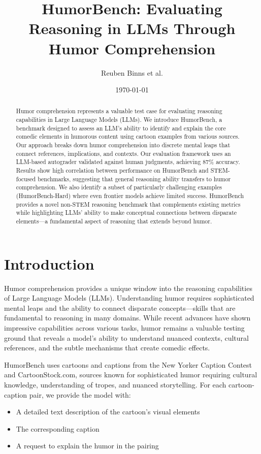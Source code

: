\documentclass[twocolumn]{article}
\title{HumorBench: Evaluating Reasoning in LLMs Through Humor Comprehension}
\author{Reuben Binns et al.}
\date{\today}
\begin{document}
\maketitle

\begin{abstract}
Humor comprehension represents a valuable test case for evaluating reasoning capabilities in Large Language Models (LLMs). We introduce HumorBench, a benchmark designed to assess an LLM's ability to identify and explain the core comedic elements in humorous content using cartoon examples from various sources. Our approach breaks down humor comprehension into discrete mental leaps that connect references, implications, and contexts. Our evaluation framework uses an LLM-based autograder validated against human judgments, achieving 87\% accuracy. Results show high correlation between performance on HumorBench and STEM-focused benchmarks, suggesting that general reasoning ability transfers to humor comprehension. We also identify a subset of particularly challenging examples (HumorBench-Hard) where even frontier models achieve limited success. HumorBench provides a novel non-STEM reasoning benchmark that complements existing metrics while highlighting LLMs' ability to make conceptual connections between disparate elements—a fundamental aspect of reasoning that extends beyond humor.
\end{abstract}

\section{Introduction}

Humor comprehension provides a unique window into the reasoning capabilities of Large Language Models (LLMs). Understanding humor requires sophisticated mental leaps and the ability to connect disparate concepts—skills that are fundamental to reasoning in many domains. While recent advances have shown impressive capabilities across various tasks, humor remains a valuable testing ground that reveals a model's ability to understand nuanced contexts, cultural references, and the subtle mechanisms that create comedic effects.

HumorBench uses cartoons and captions from the New Yorker Caption Contest and CartoonStock.com, sources known for sophisticated humor requiring cultural knowledge, understanding of tropes, and nuanced storytelling. For each cartoon-caption pair, we provide the model with:

\begin{itemize}
    \item A detailed text description of the cartoon's visual elements
    \item The corresponding caption
    \item A request to explain the humor in the pairing
\end{itemize}
\end{document}
